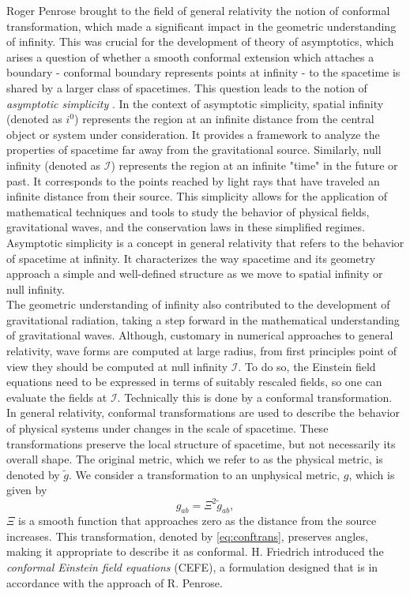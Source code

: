 Roger Penrose brought to the field of general relativity the notion of conformal transformation, which made a significant impact in the geometric understanding of infinity. This was crucial for the development of theory of asymptotics, which arises a question of whether a smooth conformal extension which attaches a boundary - conformal boundary represents points at infinity - to the spacetime is shared by a larger class of spacetimes. This question leads to the notion of \textit{asymptotic simplicity} \cite{Val16}. In the context of asymptotic simplicity, spatial infinity (denoted as $i^0$) represents the region at an infinite distance from the central object or system under consideration. It provides a framework to analyze the properties of spacetime far away from the gravitational source. Similarly, null infinity (denoted as $\mathscr{I}$) represents the region at an infinite "time" in the future or past. It corresponds to the points reached by light rays that have traveled an infinite distance from their source. This simplicity allows for the application of mathematical techniques and tools to study the behavior of physical fields, gravitational waves, and the conservation laws in these simplified regimes.
Asymptotic simplicity is a concept in general relativity that refers to the behavior of spacetime at infinity. It characterizes the way spacetime and its geometry approach a simple and well-defined structure as we move to spatial infinity or null infinity.
\\
The geometric understanding of infinity also contributed to the development of gravitational radiation, taking a step forward in the mathematical understanding of gravitational waves. Although, customary in numerical approaches to general relativity, wave forms are computed at large radius, from first principles point of view they should be computed at null infinity $\mathscr{I}$. To do so, the Einstein field equations need to be expressed in terms of suitably rescaled fields, so one can evaluate the fields at $\mathscr{I}$. Technically this is done by a conformal transformation. In general relativity, conformal transformations are used to describe the behavior of physical systems under changes in the scale of spacetime. These transformations preserve the local structure of spacetime, but not necessarily its overall shape. The original metric, which we refer to as the physical metric, is denoted by $\tilde{g}$. We consider a transformation to an unphysical metric, $g$, which is given by 
\begin{equation}\label{eq:conftrans}
	g_{ab} = \Xi^2 \tilde{g}_{ab},
\end{equation}
$\Xi$ is a smooth function that approaches zero as the distance from the source increases. This transformation, denoted by \eqref{eq:conftrans}, preserves angles, making it appropriate to describe it as conformal. H. Friedrich introduced the \textit{conformal Einstein field
equations} (CEFE), a formulation designed that is in accordance with
the approach of R. Penrose.
\medskip

